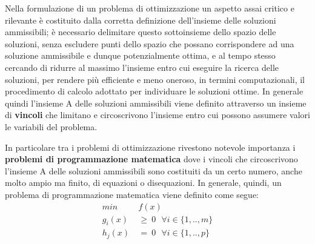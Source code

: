 Nella formulazione di un problema di ottimizzazione un aspetto assai critico e rilevante è costituito dalla corretta definizione dell'insieme delle soluzioni ammissibili; è necessario delimitare questo sottoinsieme dello spazio delle soluzioni, senza escludere punti dello spazio che possano corrispondere ad una soluzione ammissibile e dunque potenzialmente ottima, e al tempo stesso cercando di ridurre al massimo l'insieme entro cui eseguire la ricerca delle soluzioni, per rendere più efficiente e meno oneroso, in termini computazionali, il procedimento di calcolo adottato per individuare le soluzioni ottime. In generale quindi l'insieme A delle soluzioni ammissibili viene definito attraverso un insieme di \textbf{vincoli} che limitano e circoscrivono l'insieme entro cui possono assumere valori le variabili del problema.

In particolare tra i problemi di ottimizzazione rivestono notevole importanza i \textbf{problemi di programmazione matematica} dove i vincoli che circoscrivono l'insieme A delle soluzioni ammissibili sono costituiti da un certo numero, anche molto ampio ma finito, di equazioni o disequazioni. In generale, quindi, un problema di programmazione matematica viene definito come segue:
\begin{equation}
\begin{split}
min ~ &f(x) \\
g_i(x) ~ &\geq ~ 0 ~~~ \forall i \in \{1,..,m\} \\
h_j(x) ~ &= ~ 0 ~~~ \forall i \in \{1,..,p\} \\
\end{split}
\end{equation}
\\



